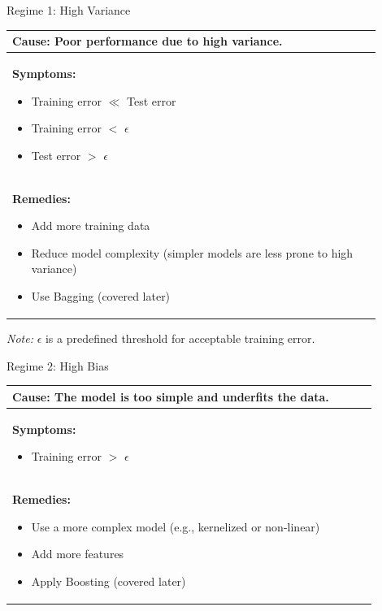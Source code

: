 \documentclass[serif, aspectratio=169]{beamer}
\begin{document}
    \begin{frame}{Regime 1: High Variance}
        \centering
        \renewcommand{\arraystretch}{1.3}
        \begin{tabular}{|p{0.9\linewidth}|}
            \hline
            \textbf{Cause:} Poor performance due to high variance. \\ \hline

            \textbf{Symptoms:}
            \begin{itemize}
                \item Training error $\ll$ Test error
                \item Training error $<$ $\epsilon$
                \item Test error $>$ $\epsilon$
            \end{itemize} \\ \hline

            \textbf{Remedies:}
            \begin{itemize}
                \item Add more training data
                \item Reduce model complexity (simpler models are less prone to high variance)
                \item Use Bagging (covered later)
            \end{itemize} \\ \hline
        \end{tabular}


        \vspace{0.3cm}
        \textit{Note:} $\epsilon$ is a predefined threshold for acceptable training error.
    \end{frame}


    \begin{frame}{Regime 2: High Bias}
        \centering
        \renewcommand{\arraystretch}{1.3}
        \begin{tabular}{|p{0.9\linewidth}|}
            \hline
            \textbf{Cause:} The model is too simple and underfits the data. \\ \hline

            \textbf{Symptoms:}
            \begin{itemize}
                \item Training error $>$ $\epsilon$
            \end{itemize} \\ \hline

            \textbf{Remedies:}
            \begin{itemize}
                \item Use a more complex model (e.g., kernelized or non-linear)
                \item Add more features
                \item Apply Boosting (covered later)
            \end{itemize} \\ \hline
        \end{tabular}
    \end{frame}
\end{document}
